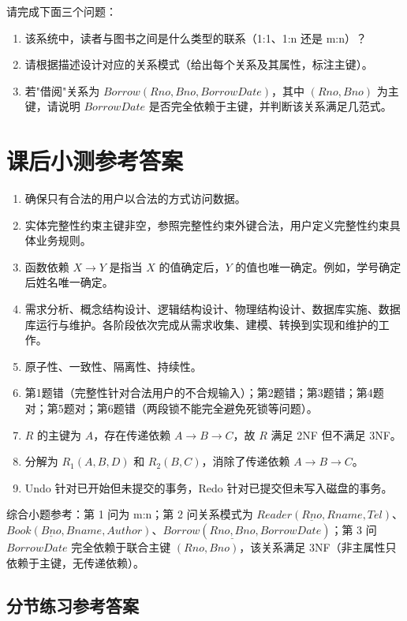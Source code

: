 \documentclass{../../note}
\begin{document}
请完成下面三个问题：

\begin{enumerate}
  \item 该系统中，读者与图书之间是什么类型的联系（1:1、1:n 还是 m:n）？
  \item 请根据描述设计对应的关系模式（给出每个关系及其属性，标注主键）。
  \item 若"借阅"关系为 $Borrow(Rno, Bno, BorrowDate)$，其中 $(Rno, Bno)$ 为主键，请说明 $BorrowDate$ 是否完全依赖于主键，并判断该关系满足几范式。
\end{enumerate}

\section{课后小测参考答案}

\begin{enumerate}
  \item 确保只有合法的用户以合法的方式访问数据。
  \item 实体完整性约束主键非空，参照完整性约束外键合法，用户定义完整性约束具体业务规则。
  \item 函数依赖 $X \to Y$ 是指当 $X$ 的值确定后，$Y$ 的值也唯一确定。例如，学号确定后姓名唯一确定。
  \item 需求分析、概念结构设计、逻辑结构设计、物理结构设计、数据库实施、数据库运行与维护。各阶段依次完成从需求收集、建模、转换到实现和维护的工作。
  \item 原子性、一致性、隔离性、持续性。
  \item 第1题错（完整性针对合法用户的不合规输入）；第2题错；第3题错；第4题对；第5题对；第6题错（两段锁不能完全避免死锁等问题）。
  \item $R$ 的主键为 $A$，存在传递依赖 $A \to B \to C$，故 $R$ 满足 2NF 但不满足 3NF。
  \item 分解为 $R_1(A, B, D)$ 和 $R_2(B, C)$，消除了传递依赖 $A \to B \to C$。
  \item Undo 针对已开始但未提交的事务，Redo 针对已提交但未写入磁盘的事务。
\end{enumerate}

综合小题参考：第 1 问为 m:n；第 2 问关系模式为 $Reader(\underline{Rno}, Rname, Tel)$、$Book(\underline{Bno}, Bname, Author)$、$Borrow(\underline{Rno, Bno}, BorrowDate)$；第 3 问 $BorrowDate$ 完全依赖于联合主键 $(Rno, Bno)$，该关系满足 3NF（非主属性只依赖于主键，无传递依赖）。

\subsection{分节练习参考答案}
\end{document}
